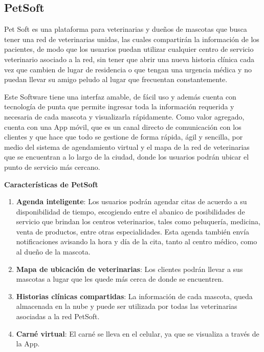 \subsection{PetSoft}
Pet Soft es una plataforma para veterinarias y dueños de mascotas que busca tener una red de veterinarias unidas, las cuales compartirán la información de los pacientes, de modo que los usuarios puedan utilizar cualquier centro de servicio veterinario asociado a la red, sin tener que abrir una nueva historia clínica cada vez que cambien de lugar de residencia o que tengan una urgencia médica y no puedan llevar  su amigo peludo al lugar que frecuentan constantemente.

Este Software tiene una interfaz amable, de fácil uso y además cuenta con tecnología de punta que permite ingresar toda la información requerida y necesaria de cada mascota y visualizarla rápidamente.  Como valor agregado, cuenta con una App móvil, que es un canal directo de comunicación con los clientes y que hace que todo se gestione de forma rápida, ágil y sencilla, por medio del sistema de agendamiento virtual y el mapa de la red de veterinarias que se encuentran a lo largo de la ciudad, donde los usuarios podrán ubicar el punto de servicio más cercano.
\newline
\newline


\textbf{Características de PetSoft}


\begin{enumerate}
\item	\textbf{Agenda inteligente}: Los usuarios podrán agendar citas de acuerdo a su disponibilidad de tiempo, escogiendo entre el abanico de posibilidades de servicio  que brindan los centros veterinarios, tales como peluquería, medicina, venta de productos, entre otras especialidades.  Esta agenda también envía notificaciones avisando la hora y día de la cita, tanto al centro médico, como al dueño de la mascota.
	
	
	
 \item \textbf{Mapa de ubicación de veterinarias}: Los clientes podrán llevar a sus mascotas a lugar que les quede más cerca de donde se encuentren.
	
	
\item \textbf{Historias clínicas compartidas}: La información de cada mascota, queda almacenada en la nube y puede ser utilizada por todas las veterinarias asociadas a la red PetSoft.
	
	
\item \textbf{Carné virtual}: El carné se lleva en el celular, ya que se visualiza a través de la App.
\end{enumerate}

